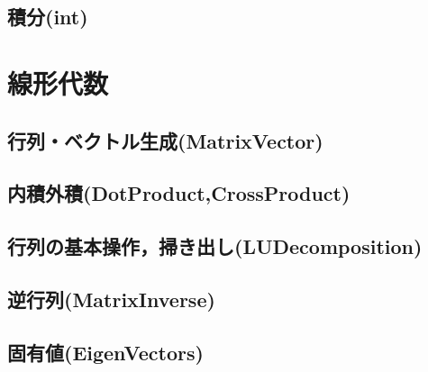 \pagebreak
\section{積分(int)}
 
 
 
 

\chapter{線形代数}
\section{行列・ベクトル生成(MatrixVector)}
 
 
 

\pagebreak
\section{内積外積(DotProduct,CrossProduct)}
 
 
 

\pagebreak
\section{行列の基本操作，掃き出し(LUDecomposition)}
 
 
 

\pagebreak
\section{逆行列(MatrixInverse)}
 
 
 

\pagebreak
\section{固有値(EigenVectors)}
 
 
 

